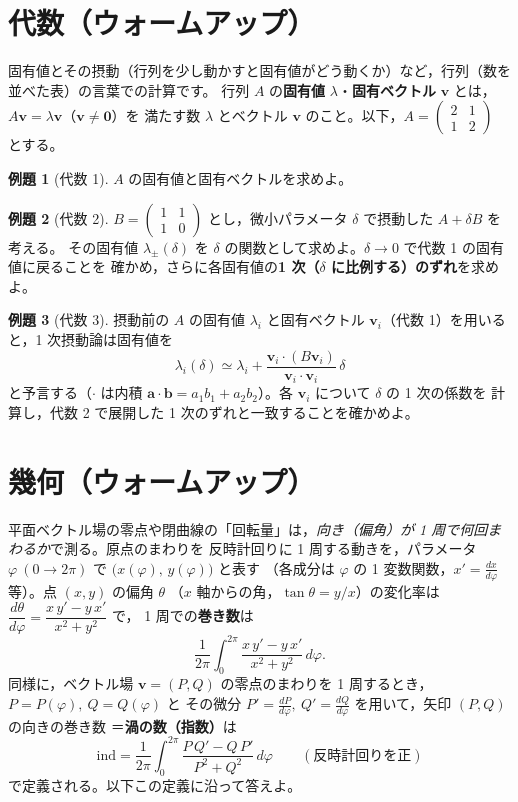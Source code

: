 \documentclass[dvipdfmx, uplatex]{jsarticle}
\theoremstyle{definition}
\newtheorem*{ex}{例題}
\begin{document}
\bigskip
\section{代数（ウォームアップ）}
固有値とその摂動（行列を少し動かすと固有値がどう動くか）など，行列（数を並べた表）の言葉での計算です。
行列 $A$ の\textbf{固有値} $\lambda$・\textbf{固有ベクトル} $\bm v$ とは，$A\bm v=\lambda\bm v$（$\bm v\neq\bm0$）を
満たす数 $\lambda$ とベクトル $\bm v$ のこと。以下，$A=\begin{pmatrix}2&1\\ 1&2\end{pmatrix}$ とする。

\begin{ex}[代数 1]
$A$ の固有値と固有ベクトルを求めよ。
\end{ex}

\begin{ex}[代数 2]
$B=\begin{pmatrix}1&1\\ 1&0\end{pmatrix}$ とし，微小パラメータ $\delta$ で摂動した $A+\delta B$ を考える。
その固有値 $\lambda_\pm(\delta)$ を $\delta$ の関数として求めよ。$\delta\to0$ で代数 1 の固有値に戻ることを
確かめ，さらに各固有値の\textbf{1 次（$\delta$ に比例する）のずれ}を求めよ。
\end{ex}

\begin{ex}[代数 3]
摂動前の $A$ の固有値 $\lambda_i$ と固有ベクトル $\bm v_i$（代数 1）を用いると，1 次摂動論は固有値を
\[
    \lambda_i(\delta)\simeq\lambda_i+\frac{\bm v_i\cdot(B\bm v_i)}{\bm v_i\cdot\bm v_i}\,\delta
\]
と予言する（$\cdot$ は内積 $\bm a\cdot\bm b=a_1b_1+a_2b_2$）。各 $\bm v_i$ について $\delta$ の 1 次の係数を
計算し，代数 2 で展開した 1 次のずれと一致することを確かめよ。
\end{ex}

\section{幾何（ウォームアップ）}
平面ベクトル場の零点や閉曲線の「回転量」は，\emph{向き（偏角）が 1 周で何回まわるか}で測る。原点のまわりを
反時計回りに 1 周する動きを，パラメータ $\varphi\ (0\to2\pi)$ で $\bigl(x(\varphi),\,y(\varphi)\bigr)$ と表す
（各成分は $\varphi$ の 1 変数関数，$x'=\tfrac{dx}{d\varphi}$ 等）。点 $(x,y)$ の偏角 $\theta$
（$x$ 軸からの角，$\tan\theta=y/x$）の変化率は $\dfrac{d\theta}{d\varphi}=\dfrac{x\,y'-y\,x'}{x^2+y^2}$ で，
1 周での\textbf{巻き数}は
\[
    \frac{1}{2\pi}\int_0^{2\pi}\frac{x\,y'-y\,x'}{x^2+y^2}\,d\varphi .
\]
同様に，ベクトル場 $\bm v=(P,Q)$ の零点のまわりを 1 周するとき，$P=P(\varphi),\ Q=Q(\varphi)$ と
その微分 $P'=\tfrac{dP}{d\varphi},\ Q'=\tfrac{dQ}{d\varphi}$ を用いて，矢印 $(P,Q)$ の向きの巻き数
＝\textbf{渦の数（指数）}は
\[
    \mathrm{ind}=\frac{1}{2\pi}\int_0^{2\pi}\frac{P\,Q'-Q\,P'}{P^2+Q^2}\,d\varphi\qquad(\text{反時計回りを正})
\]
で定義される。以下この定義に沿って答えよ。
\end{document}
